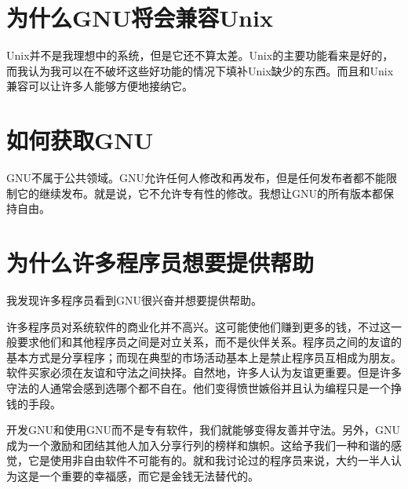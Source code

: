\section{为什么GNU将会兼容Unix}
Unix并不是我理想中的系统，但是它还不算太差。Unix的主要功能看来是好的，而我认为我可以在不破坏这些好功能的情况下填补Unix缺少的东西。而且和Unix兼容可以让许多人能够方便地接纳它。\par
\section{如何获取GNU}
GNU不属于公共领域。GNU允许任何人修改和再发布，但是任何发布者都不能限制它的继续发布。就是说，它不允许专有性的修改。我想让GNU的所有版本都保持自由。\par
\section{为什么许多程序员想要提供帮助}
我发现许多程序员看到GNU很兴奋并想要提供帮助。\par
许多程序员对系统软件的商业化并不高兴。这可能使他们赚到更多的钱，不过这一般要求他们和其他程序员之间是对立关系，而不是伙伴关系。程序员之间的友谊的基本方式是分享程序；而现在典型的市场活动基本上是禁止程序员互相成为朋友。软件买家必须在友谊和守法之间抉择。自然地，许多人认为友谊更重要。但是许多守法的人通常会感到选哪个都不自在。他们变得愤世嫉俗并且认为编程只是一个挣钱的手段。\par
开发GNU和使用GNU而不是专有软件，我们就能够变得友善并守法。另外，GNU成为一个激励和团结其他人加入分享行列的榜样和旗帜。这给予我们一种和谐的感觉，它是使用非自由软件不可能有的。就和我讨论过的程序员来说，大约一半人认为这是一个重要的幸福感，而它是金钱无法替代的。\par
